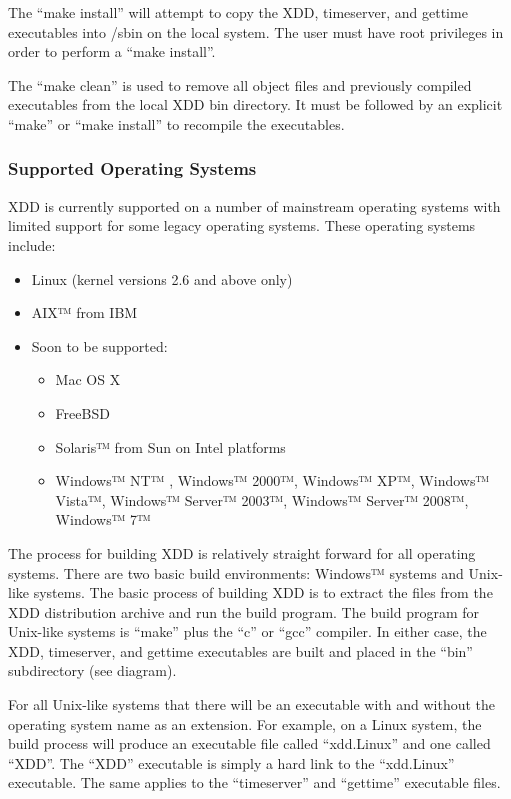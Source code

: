The ``make install'' will attempt to copy the XDD, timeserver, and gettime executables into /sbin on the local system. The user must have root privileges in order to perform a ``make install''.

The ``make clean'' is used to remove all object files and previously compiled executables from the local XDD bin directory. It must be followed by an explicit ``make'' or ``make install'' to recompile the executables.

\subsubsection{Supported Operating Systems}\label{supported-operating-systems}

XDD is currently supported on a number of mainstream operating systems with limited support for some legacy operating systems. These operating systems include:

\begin{itemize}
\item
  Linux (kernel versions 2.6 and above only)
\item
  AIX™ from IBM
\item
  Soon to be supported:

  \begin{itemize}
  \item
    Mac OS X
  \item
    FreeBSD
  \item
    Solaris™ from Sun on Intel platforms
  \item
    Windows™ NT™ , Windows™ 2000™, Windows™ XP™, Windows™ Vista™, Windows™ Server™ 2003™, Windows™ Server™ 2008™, Windows™ 7™
  \end{itemize}
\end{itemize}

The process for building XDD is relatively straight forward for all operating systems. There are two basic build environments: Windows™ systems and Unix-like systems. The basic process of building XDD is to extract the files from the XDD distribution archive and run the build program. The build program for Unix-like systems is ``make'' plus the ``c'' or ``gcc'' compiler. In either case, the XDD, timeserver, and gettime executables are built and placed in the ``bin'' subdirectory (see diagram).

For all Unix-like systems that there will be an executable with and without the operating system name as an extension. For example, on a Linux system, the build process will produce an executable file called ``xdd.Linux'' and one called ``XDD''. The ``XDD'' executable is simply a hard link to the ``xdd.Linux'' executable. The same applies to the ``timeserver'' and ``gettime'' executable files.

